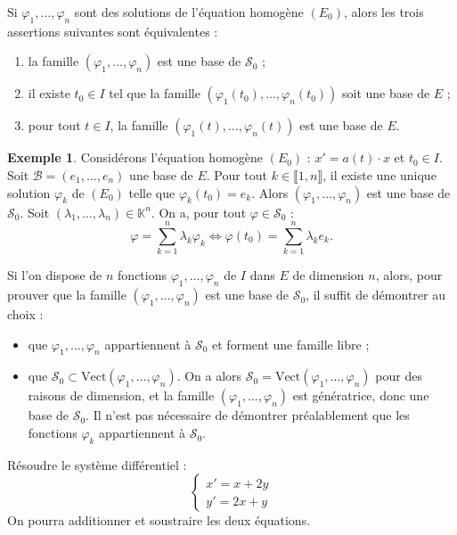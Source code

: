 \documentclass[french]{article}
\newcommand{\K}{\mathbb{K}}
\newcommand{\Vect}{\text{Vect}}
\theoremstyle{plain}
\theoremstyle{definition}
\newtheorem*{ex}{Exemple}
\theoremstyle{remark}
\begin{document}
\begin{prop}%
	Si $\varphi_1,\ldots,\varphi_n$ sont des solutions de l'équation homogène $(E_0)$, alors les trois assertions suivantes sont équivalentes :
	\begin{enumerate}[label=(\roman*)]
		\item la famille $(\varphi_1,\ldots,\varphi_n)$ est une base de $\mathcal{S}_0$ ;
		\item il existe $t_0\in I$ tel que la famille $(\varphi_1(t_0),\ldots,\varphi_n(t_0))$ soit une base de $E$ ;
		\item pour tout $t\in I$, la famille $(\varphi_1(t),\ldots,\varphi_n(t))$ est une base de $E$.
	\end{enumerate}
\end{prop}

\begin{ex}
	Considérons l'équation homogène $(E_0)$ : $x'=a(t)\cdot x$ et $t_0\in I$. Soit $\mathcal{B}=(e_1,\ldots,e_n)$ une base de $E$. Pour tout $k\in\llbracket1,n\rrbracket$, il existe une unique solution $\varphi_k$ de $(E_0)$ telle que $\varphi_k(t_0)=e_k$. Alors $(\varphi_1,\ldots,\varphi_n)$ est une base de $\mathcal{S}_0$. Soit $(\lambda_1,\ldots,\lambda_n)\in\K^n$. On a, pour tout $\varphi\in\mathcal{S}_0$ :
	$$\varphi=\sum_{k=1}^{n}\lambda_k\varphi_k\iff\varphi(t_0)=\sum_{k=1}^{n}\lambda_ke_k.$$
\end{ex}

\begin{met}
	Si l'on dispose de $n$ fonctions $\varphi_1,\ldots,\varphi_n$ de $I$ dans $E$ de dimension $n$, alors, pour prouver que la famille $(\varphi_1,\ldots,\varphi_n)$ est une base de $\mathcal{S}_0$, il suffit de démontrer au choix :
	\begin{itemize}
		\item que $\varphi_1,\ldots,\varphi_n$ appartiennent à $\mathcal{S}_0$ et forment une famille libre ;
		\item que $\mathcal{S}_0\subset\Vect(\varphi_1,\ldots,\varphi_n)$. On a alors $\mathcal{S}_0=\Vect(\varphi_1,\ldots,\varphi_n)$ pour des raisons de dimension, et la famille $(\varphi_1,\ldots,\varphi_n)$ est génératrice, donc une base de $\mathcal{S}_0$. Il n'est pas nécessaire de démontrer préalablement que les fonctions $\varphi_k$ appartiennent à $\mathcal{S}_0$.
	\end{itemize}
\end{met}

\begin{exo}
	Résoudre le système différentiel :
	$$\begin{cases}
		x'=x+2y\\
		y'=2x+y
	\end{cases}$$ On pourra additionner et soustraire les deux équations.
\end{exo}
\end{document}
